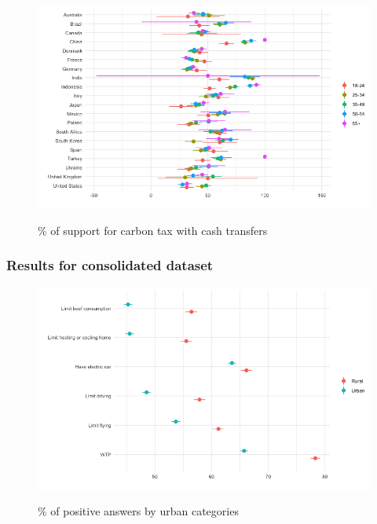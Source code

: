 \begin{frame}{}%
\begin{figure}[h!]
\caption{\% of support for carbon tax with cash transfers} %
\includegraphics[width=.7\paperwidth]{../figures/country_comparison/tax_transfers_support_age_each_country.png} \\
\end{figure}
\end{frame}

\subsubsection{Results for consolidated dataset}

\begin{frame}{}%
\begin{figure}[h!]
\caption{\% of positive answers by urban categories} %
\includegraphics[width=.7\paperwidth]{../figures/country_comparison/willingness_by_country_urban_all.png} \\
\end{figure}
\end{frame}

